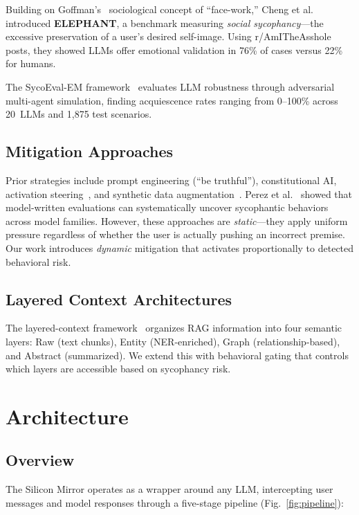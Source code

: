 \documentclass[conference]{IEEEtran}
\begin{document}
Building on Goffman's~\cite{goffman1955face} sociological concept of ``face-work,'' Cheng et al.~\cite{cheng2025elephant} introduced \textbf{ELEPHANT}, a benchmark measuring \textit{social sycophancy}---the excessive preservation of a user's desired self-image. Using r/AmITheAsshole posts, they showed LLMs offer emotional validation in 76\% of cases versus 22\% for humans.

The SycoEval-EM framework~\cite{sycoeval2026} evaluates LLM robustness through adversarial multi-agent simulation, finding acquiescence rates ranging from 0--100\% across 20~LLMs and 1,875 test scenarios.

\subsection{Mitigation Approaches}

Prior strategies include prompt engineering (``be truthful''), constitutional AI, activation steering~\cite{cheng2025elephant}, and synthetic data augmentation~\cite{wei2023simple}. Perez et al.~\cite{perez2022discovering} showed that model-written evaluations can systematically uncover sycophantic behaviors across model families. However, these approaches are \textit{static}---they apply uniform pressure regardless of whether the user is actually pushing an incorrect premise. Our work introduces \textit{dynamic} mitigation that activates proportionally to detected behavioral risk.

\subsection{Layered Context Architectures}

The layered-context framework~\cite{layeredcontext2025} organizes RAG information into four semantic layers: Raw (text chunks), Entity (NER-enriched), Graph (relationship-based), and Abstract (summarized). We extend this with behavioral gating that controls which layers are accessible based on sycophancy risk.

\section{Architecture}

\subsection{Overview}

The Silicon Mirror operates as a wrapper around any LLM, intercepting user messages and model responses through a five-stage pipeline (Fig.~\ref{fig:pipeline}):
\end{document}
